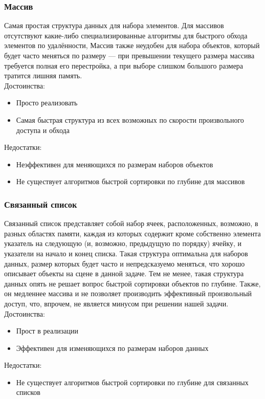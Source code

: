 \documentclass[a4paper,12pt]{report}
\numberwithin{equation}{section}
\begin{document}
\subsubsection*{Массив}
Самая простая структура данных для набора элементов. Для массивов отсутствуют какие-либо специализированные алгоритмы для быстрого обхода элементов по удалённости, Массив также неудобен для набора объектов, который будет часто меняться по размеру --- при превышении текущего размера массива требуется полная его перестройка, а при выборе слишком большого размера тратится лишняя память. \\
Достоинства:
\begin{itemize}
\item Просто реализовать
\item Самая быстрая структура из всех возможных по скорости произвольного доступа и обхода
\end{itemize}
Недостатки:
\begin{itemize}
\item Неэффективен для меняющихся по размерам наборов объектов
\item Не существует алгоритмов быстрой сортировки по глубине для массивов
\end{itemize}

\subsubsection*{Связанный список}
Связанный список представляет собой набор ячеек, расположенных, возможно, в разных областях памяти, каждая из которых содержит кроме собственно элемента указатель на следующую (и, возможно, предыдущую по порядку) ячейку, и указатели на начало и конец списка. Такая структура оптимальна для наборов данных, размер которых будет часто и непредсказуемо меняться, что хорошо описывает объекты на сцене в данной задаче. Тем не менее, такая структура данных опять не решает вопрос быстрой сортировки объектов по глубине. Также, он медленнее массива и не позволяет производить эффективный произвольный доступ, что, впрочем, не является минусом при решении нашей задачи. \\
Достоинства:
\begin{itemize}
\item Прост в реализации
\item Эффективен для изменяющихся по размерам наборов данных
\end{itemize}
Недостатки:
\begin{itemize}
\item Не существует алгоритмов быстрой сортировки по глубине для связанных списков
\end{itemize}
\end{document}
